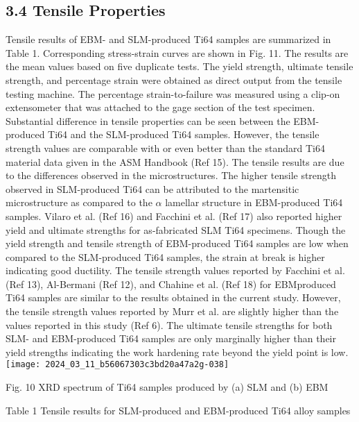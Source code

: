 \documentclass[10pt]{article}
\begin{document}
\subsection*{3.4 Tensile Properties}
Tensile results of EBM- and SLM-produced Ti64 samples are summarized in Table 1. Corresponding stress-strain curves are shown in Fig. 11. The results are the mean values based on five duplicate tests. The yield strength, ultimate tensile strength, and percentage strain were obtained as direct output from the tensile testing machine. The percentage strain-to-failure was measured using a clip-on extensometer that was attached to the gage section of the test specimen. Substantial difference in tensile properties can be seen between the EBM-produced Ti64 and the SLM-produced Ti64 samples. However, the tensile strength values are comparable with or even better than the standard Ti64 material data given in the ASM Handbook (Ref 15). The tensile results are due to the differences observed in the microstructures. The higher tensile strength observed in SLM-produced Ti64 can be attributed to the martensitic microstructure as compared to the $\alpha$ lamellar structure in EBM-produced Ti64 samples. Vilaro et al. (Ref 16) and Facchini et al. (Ref 17) also reported higher yield and ultimate strengths for as-fabricated SLM Ti64 specimens. Though the yield strength and tensile strength of EBM-produced Ti64 samples are low when compared to the SLM-produced Ti64 samples, the strain at break is higher indicating good ductility. The tensile strength values reported by Facchini et al. (Ref 13), Al-Bermani (Ref 12), and Chahine et al. (Ref 18) for EBMproduced Ti64 samples are similar to the results obtained in the current study. However, the tensile strength values reported by Murr et al. are slightly higher than the values reported in this study (Ref 6). The ultimate tensile strengths for both SLM- and EBM-produced Ti64 samples are only marginally higher than their yield strengths indicating the work hardening rate beyond the yield point is low.\\
\texttt{[image: 2024\_03\_11\_b56067303c3bd20a47a2g-038]}

Fig. 10 XRD spectrum of Ti64 samples produced by (a) SLM and (b) EBM

Table 1 Tensile results for SLM-produced and EBM-produced Ti64 alloy samples
\end{document}

